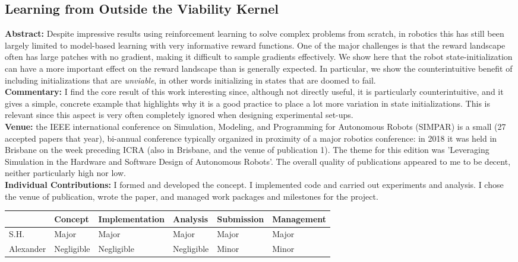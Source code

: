 \subsection{Learning from Outside the Viability Kernel}
\textbf{Abstract: }
Despite impressive results using reinforcement learning to solve complex problems from scratch, in robotics this has still been largely limited to model-based learning with very informative reward functions. One of the major challenges is that the reward landscape often has large patches with no gradient, making it difficult to sample gradients effectively. We show here that the robot state-initialization can have a more important effect on the reward landscape than is generally expected. In particular, we show the counterintuitive benefit of including initializations that are \emph{unviable}, in other words initializing in states that are doomed to fail. \\
\textbf{Commentary: }
I find the core result of this work interesting since, although not directly useful, it is particularly counterintuitive, and it gives a simple, concrete example that highlights why it is a good practice to place a lot more variation in state initializations. This is relevant since this aspect is very often completely ignored when designing experimental set-ups.
\\
\textbf{Venue: }
the IEEE international conference on Simulation, Modeling, and Programming for Autonomous Robots (SIMPAR) is a small (27 accepted papers that year), bi-annual conference typically organized in proximity of a major robotics conference: in 2018 it was held in Brisbane on the week preceding ICRA (also in Brisbane, and the venue of publication 1). The theme for this edition was 'Leveraging Simulation in the Hardware and Software Design of Autonomous Robots'. The overall quality of publications appeared to me to be decent, neither particularly high nor low.
\\
\textbf{Individual Contributions: }
I formed and developed the concept. I implemented code and carried out experiments and analysis. I chose the venue of publication, wrote the paper, and managed work packages and milestones for the project. 
\begin{table}[h!]
\begin{tabular}{l|l|l|l|l|l|}
\cline{2-6}
 \textbf{} & \textbf{Concept} & {\footnotesize \textbf{Implementation}} & \textbf{Analysis} & \textbf{Submission} & {\footnotesize \textbf{Management}} \\ \hline
\multicolumn{1}{|l|}{S.H.} & Major & Major & Major & Major & Major \\ \hline
\multicolumn{1}{|l|}{Alexander} & Negligible & Negligible & Negligible & Minor & Minor \\ \hline
\end{tabular}
\end{table}
